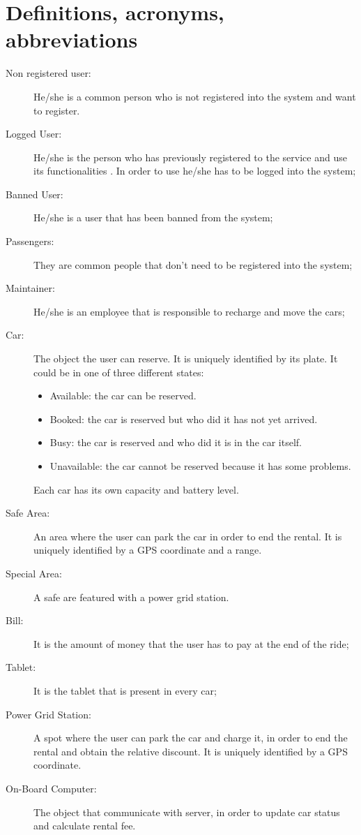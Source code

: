 \section{Definitions, acronyms, abbreviations}
\begin{description}
    \item[Non registered user:] He/she is a common person who is not registered into the system and want to register.
	\item [Logged User:] He/she is the person who has previously registered to the service and use its functionalities . In order to use he/she has to be logged into the system;
	\item[Banned User:] He/she is a user that has been banned from the system;
	\item[Passengers:] They are common people that don't need to be registered into the system;
	\item[Maintainer:] He/she is an employee that is responsible to recharge and move the cars;
	\item [Car:] The object the user can reserve. It is uniquely identified by its plate. It could be in one of three different states:
	\begin{itemize}
		\item Available: the car can be reserved.
		\item Booked: the car is reserved but who did it has not yet arrived.
		\item Busy: the car is reserved and who did it is in the car itself.
		\item Unavailable: the car cannot be reserved because it has some problems.
	\end{itemize}
	Each car has its own capacity and battery level.
	\item [Safe Area:] An area where the user can park the car in order to end the rental. It is uniquely identified by a GPS coordinate and a range.
	\item[Special Area:] A safe are featured with a power grid station.
	\item[Bill:] It is the amount of money that the user has to pay at the end of the ride;
	\item[Tablet:] It is the tablet that is present in every car;
	\item [Power Grid Station:] A spot where the user can park the car and charge it, in order to end the rental and obtain the relative discount. It is uniquely identified by a GPS coordinate.
	\item [On-Board Computer:] The object that communicate with server, in order to update car status and calculate rental fee.
	
\end{description}
